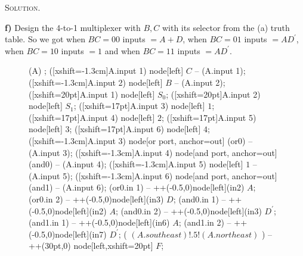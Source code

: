 \documentclass[12pt, a4paper, oneside]{article}
\newenvironment{solution}{\par\noindent\textsc{Solution. }}{\\\par}
\begin{document}
\begin{solution}
\begin{figure}[!htbp]
\begin{circuitikz}
    \end{circuitikz}
\end{figure}
\newline\textbf{f)} Design the 4-to-1 multiplexer with $B,C$ with its selector from the (a) truth table. So we got when $BC=00$ inputs $= A+D$, when $BC=01$ inputs $= AD^{\prime}$, when $BC=10$ inputs $= 1$ and when $BC=11$ inputs $= AD^{\prime}$.
    \begin{figure}[!htbp]
    \centering
    \setlength{\belowcaptionskip}{+0.4cm}
    \begin{circuitikz}
    \node[and gate, inputs={nnnnnn}, and gate IEC symbol={MUX}, text height=8cm,text width=2cm, very thick] (A) {};
    \draw  ([xshift=-1.3cm]A.input 1) node[left] {$C$} -- (A.input 1);
    \draw  ([xshift=-1.3cm]A.input 2) node[left] {$B$} -- (A.input 2);
    \draw  ([xshift=20pt]A.input 1) node[left] {$S_0$};
    \draw  ([xshift=20pt]A.input 2) node[left] {$S_1$};
    \draw  ([xshift=17pt]A.input 3) node[left] {$1$};
    \draw  ([xshift=17pt]A.input 4) node[left] {$2$};
    \draw  ([xshift=17pt]A.input 5) node[left] {$3$};
    \draw  ([xshift=17pt]A.input 6) node[left] {$4$};
    \draw  ([xshift=-1.3cm]A.input 3) node[or port, anchor=out] (or0){} -- (A.input 3);
    \draw  ([xshift=-1.3cm]A.input 4) node[and port, anchor=out] (and0){} -- (A.input 4);
    \draw  ([xshift=-1.3cm]A.input 5) node[left] {$1$} -- (A.input 5);
    \draw  ([xshift=-1.3cm]A.input 6) node[and port, anchor=out] (and1){} -- (A.input 6);
    \draw (or0.in 1) -- ++(-0.5,0)node[left](in2) {$A$};
    \draw (or0.in 2) -- ++(-0.5,0)node[left](in3) {$D$};
    \draw (and0.in 1) -- ++(-0.5,0)node[left](in2) {$A$};
    \draw (and0.in 2) -- ++(-0.5,0)node[left](in3) {$D^{\prime}$};
    \draw (and1.in 1) -- ++(-0.5,0)node[left](in6) {$A$};
    \draw (and1.in 2) -- ++(-0.5,0)node[left](in7) {$D^{\prime}$};
    \draw ( $ (A.south east)!.5!(A.north east) $ ) -- ++(30pt,0) node[left,xshift=20pt] {$F$}; 
    \end{circuitikz}
\end{figure}
\end{solution}
\end{document}
